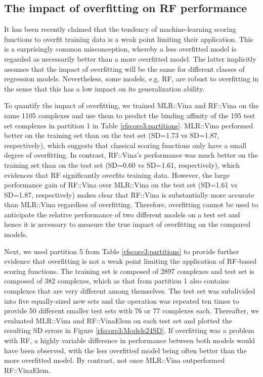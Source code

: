 \subsection{The impact of overfitting on RF performance}

It has been recently claimed \citep{1372} that the tendency of machine-learning scoring functions to overfit training data is a weak point limiting their application. This is a surprisingly common misconception, whereby a less overfitted model is regarded as necessarily better than a more overfitted model. The latter implicitly assumes that the impact of overfitting will be the same for different classes of regression models. Nevertheless, some models, e.g. RF, are robust to overfitting in the sense that this has a low impact on its generalization ability.

To quantify the impact of overfitting, we trained MLR::Vina and RF::Vina on the same 1105 complexes and use them to predict the binding affinity of the 195 test set complexes in partition 1 in Table \ref{rfscore3:partitions}. MLR::Vina performed better on the training set than on the test set (SD=1.73 vs SD=1.87, respectively), which suggests that classical scoring functions only have a small degree of overfitting. In contrast, RF::Vina's performance was much better on the training set than on the test set (SD=0.60 vs SD=1.61, respectively), which evidences that RF significantly overfits training data. However, the large performance gain of RF::Vina over MLR::Vina on the test set (SD=1.61 vs SD=1.87, respectively) makes clear that RF::Vina is substantially more accurate than MLR::Vina regardless of overfitting. Therefore, overfitting cannot be used to anticipate the relative performance of two different models on a test set and hence it is necessary to measure the true impact of overfitting on the compared models.

Next, we used partition 5 from Table \ref{rfscore3:partitions} to provide further evidence that overfitting is not a weak point limiting the application of RF-based scoring functions. The training set is composed of 2897 complexes and test set is composed of 382 complexes, which as that from partition 1 also contains complexes that are very different among themselves. The test set was subdivided into five equally-sized new sets and the operation was repeated ten times to provide 50 different smaller test sets with 76 or 77 complexes each. Thereafter, we evaluated MLR::Vina and RF::VinaElem on each test set and plotted the resulting SD errors in Figure \ref{rfscore3:Models24SD}. If overfitting was a problem with RF, a highly variable difference in performance between both models would have been observed, with the less overfitted model being often better than the more overfitted model. By contrast, not once MLR::Vina outperformed RF::VinaElem. 

